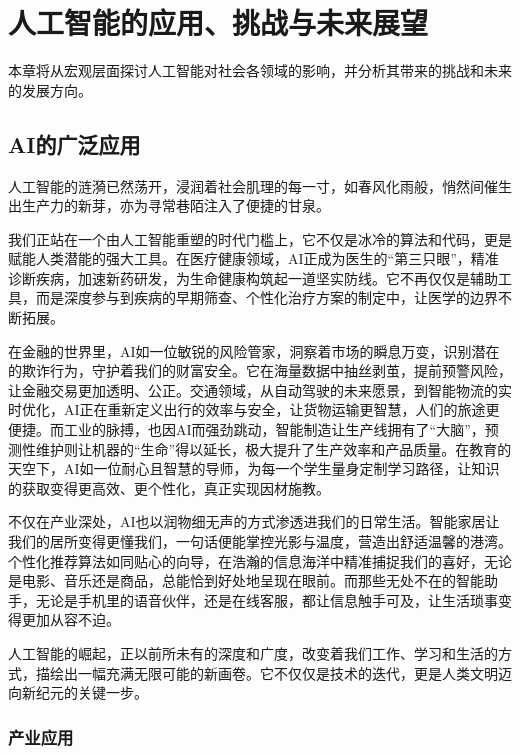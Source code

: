 \chapter{人工智能的应用、挑战与未来展望}

本章将从宏观层面探讨人工智能对社会各领域的影响，并分析其带来的挑战和未来的发展方向。

\section{AI的广泛应用}

人工智能的涟漪已然荡开，浸润着社会肌理的每一寸，如春风化雨般，悄然间催生出生产力的新芽，亦为寻常巷陌注入了便捷的甘泉。

我们正站在一个由人工智能重塑的时代门槛上，它不仅是冰冷的算法和代码，更是赋能人类潜能的强大工具。在医疗健康领域，AI正成为医生的“第三只眼”，精准诊断疾病，加速新药研发，为生命健康构筑起一道坚实防线。它不再仅仅是辅助工具，而是深度参与到疾病的早期筛查、个性化治疗方案的制定中，让医学的边界不断拓展。

在金融的世界里，AI如一位敏锐的风险管家，洞察着市场的瞬息万变，识别潜在的欺诈行为，守护着我们的财富安全。它在海量数据中抽丝剥茧，提前预警风险，让金融交易更加透明、公正。交通领域，从自动驾驶的未来愿景，到智能物流的实时优化，AI正在重新定义出行的效率与安全，让货物运输更智慧，人们的旅途更便捷。而工业的脉搏，也因AI而强劲跳动，智能制造让生产线拥有了“大脑”，预测性维护则让机器的“生命”得以延长，极大提升了生产效率和产品质量。在教育的天空下，AI如一位耐心且智慧的导师，为每一个学生量身定制学习路径，让知识的获取变得更高效、更个性化，真正实现因材施教。

不仅在产业深处，AI也以润物细无声的方式渗透进我们的日常生活。智能家居让我们的居所变得更懂我们，一句话便能掌控光影与温度，营造出舒适温馨的港湾。个性化推荐算法如同贴心的向导，在浩瀚的信息海洋中精准捕捉我们的喜好，无论是电影、音乐还是商品，总能恰到好处地呈现在眼前。而那些无处不在的智能助手，无论是手机里的语音伙伴，还是在线客服，都让信息触手可及，让生活琐事变得更加从容不迫。

人工智能的崛起，正以前所未有的深度和广度，改变着我们工作、学习和生活的方式，描绘出一幅充满无限可能的新画卷。它不仅仅是技术的迭代，更是人类文明迈向新纪元的关键一步。


\subsection{产业应用}

